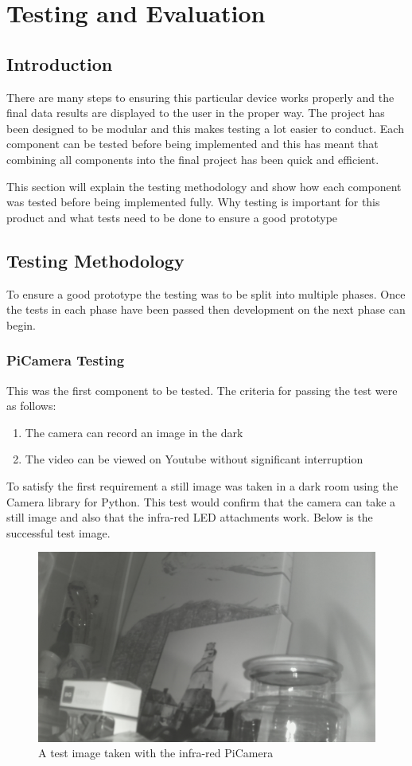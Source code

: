 \documentclass[10pt,a4paper]{article}
\begin{document}
\pagebreak
\section{Testing and Evaluation}
\subsection{Introduction}
There are many steps to ensuring this particular device works properly and the final data results are displayed to the user in the proper way. The project has been designed to be modular and this makes testing a lot easier to conduct. Each component can be tested before being implemented and this has meant that combining all components into the final project has been quick and efficient.

This section will explain the testing methodology and show how each component was tested before being implemented fully. 
Why testing is important for this product and what tests need to be done to ensure a good prototype
\subsection{Testing Methodology}
To ensure a good prototype the testing was to be split into multiple phases. Once the tests in each phase have been passed then development on the next phase can begin.
\subsubsection{PiCamera Testing}
This was the first component to be tested. The criteria for passing the test were as follows: 
\begin{enumerate}
  \item The camera can record an image in the dark
  \item The video can be viewed on Youtube without significant interruption
\end{enumerate}

To satisfy the first requirement a still image was taken in a dark room using the Camera library for Python. This test would confirm that the camera can take a still image and also that the infra-red LED attachments work. Below is the successful test image. 

\begin{figure}[H]
  \centering
    \includegraphics[width=\linewidth]{images/testimage.jpg}
    \caption{A test image taken with the infra-red PiCamera}
    \label{fig:cameraTest}
\end{figure}
\end{document}
